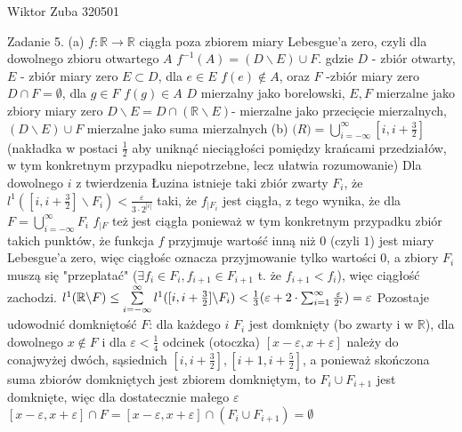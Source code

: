\documentclass{article}
\begin{document}
Wiktor Zuba 320501
\newline

Zadanie 5.
\newline
\newline
(a)\newline
$
f:\mathbb{R}\rightarrow\mathbb{R}$ ciągła poza zbiorem miary Lebesgue'a zero, czyli dla dowolnego zbioru otwartego $A$ $f^{-1}(A)=(D\backslash E)\cup F.
$ gdzie $D$ - zbiór otwarty, $E$ - zbiór miary zero $E\subset D$, dla $e\in E$ $f(e)\notin A$,\newline
oraz $F$ -zbiór miary zero $D\cap F=\emptyset$, dla $g\in F$ $f(g)\in A$\newline
$D$ mierzalny jako borelowski, $E,F$ mierzalne jako zbiory miary zero\newline
$D\backslash E=D\cap(\mathbb{R}\backslash E)$- mierzalne jako przecięcie mierzalnych, $(D\backslash E)\cup F$ mierzalne jako suma mierzalnych\newline\newline
(b)\newline
$\mathbb(R)=\bigcup\limits_{i=-\infty}^{\infty}[i,i+\frac{3}{2}]$ (nakładka w postaci $\frac{1}{2}$ aby uniknąć nieciągłości pomiędzy krańcami przedziałów,\newline
w tym konkretnym przypadku niepotrzebne, lecz ułatwia rozumowanie)\newline
Dla dowolnego $i$ z twierdzenia Łuzina istnieje taki zbiór zwarty $F_i$, że $l^1([i,i+\frac{3}{2}]\backslash F_i)<\frac{\varepsilon}{3\cdot 2^{|i|}}$\newline
taki, że $f_{|F_i}$ jest ciągła, z tego wynika, że dla $F=\bigcup\limits_{i=-\infty}^{\infty}F_i$ $f_{|F}$ też jest ciągła ponieważ w tym konkretnym przypadku
zbiór takich punktów, że funkcja $f$ przyjmuje wartość inną niż $0$ (czyli $1$) jest miary Lebesgue'a zero, więc ciągłośc oznacza przyjmowanie tylko wartości $0$,
a zbiory $F_i$ muszą się "przeplatać" ($\exists f_i\in F_i,f_{i+1}\in F_{i+1}$ t. że $f_{i+1}<f_i$), więc ciągłość zachodzi.\newline
$l^1(\mathbb{R}\backslash F)\le\sum\limits_{i=-\infty}^{\infty}l^1([i,i+\frac{3}{2}]\backslash F_i)<\frac{1}{3}(\varepsilon+2\cdot\sum_{i=1}^{\infty}\frac{\varepsilon}{2^i})=\varepsilon\newline
$ Pozostaje udowodnić domkniętość $F$: dla każdego $i$ $F_i$ jest domknięty (bo zwarty i w $\mathbb{R}$),\newline
dla dowolnego $x\notin F$ i dla $\varepsilon<\frac{1}{4}$
odcinek (otoczka) $[x-\varepsilon,x+\varepsilon]$ należy do conajwyżej dwóch, sąsiednich $[i,i+\frac{3}{2}],[i+1,i+\frac{5}{2}]$,
a ponieważ skończona suma zbiorów domkniętych jest zbiorem domkniętym, to $F_i\cup F_{i+1}$ jest domknięte, więc dla dostatecznie małego $\varepsilon$
$[x-\varepsilon,x+\varepsilon]\cap F=[x-\varepsilon,x+\varepsilon]\cap (F_i\cup F_{i+1})=\emptyset$\newpage
\end{document}
